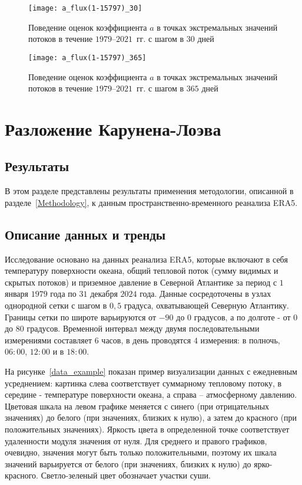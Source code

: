 \begin{figure}[!h]
	\centering
	\texttt{[image: a\_flux(1-15797)\_30]}
	\caption{Поведение оценок коэффициента $a$ в точках экстремальных значений потоков в течение $1979$--$2021$~гг. с шагом в $30$ дней}
	\label{fig_a_flux_month}
\end{figure}

\begin{figure}[!h]
	\centering
	\texttt{[image: a\_flux(1-15797)\_365]}
	\caption{Поведение оценок коэффициента $a$ в точках экстремальных значений потоков в течение $1979$--$2021$~гг. с шагом в $365$ дней}\label{fig_a_flux_year}
\end{figure}

\section{Разложение Карунена-Лоэва}
\subsection{Результаты}
\label{analysis}
В этом разделе представлены результаты применения методологии, описанной в разделе~\ref{Methodology}, к данным пространственно-временного реанализа ERA5.


\subsection{Описание данных и тренды}
Исследование основано на данных реанализа ERA5, которые включают в себя температуру поверхности океана, общий тепловой поток (сумму видимых и скрытых потоков) и приземное давление в Северной Атлантике за период с $1$ января $1979$ года по $31$ декабря $2024$ года. Данные сосредоточены в узлах однородной сетки с шагом в $0,5$ градуса, охватывающей Северную Атлантику. Границы сетки по широте варьируются от $-90$ до $0$ градусов, а по долготе - от $0$ до $80$ градусов. Временной интервал между двумя последовательными измерениями составляет $6$ часов, в день проводятся $4$ измерения: в полночь, $06:00$, $12:00$ и в $18:00$.

На рисунке~\ref{data_example} показан пример визуализации данных с ежедневным усреднением: картинка слева соответствует суммарному тепловому потоку, в середине - температуре поверхности океана, а справа -- атмосферному давлению. Цветовая шкала на левом графике меняется с синего (при отрицательных значениях) до белого (при значениях, близких к нулю), а затем до красного (при положительных значениях). Яркость цвета в определенной точке соответствует удаленности модуля значения от нуля. Для среднего и правого графиков, очевидно, значения могут быть только положительными, поэтому их шкала значений варьируется от белого (при значениях, близких к нулю) до ярко-красного. Светло-зеленый цвет обозначает участки суши.


